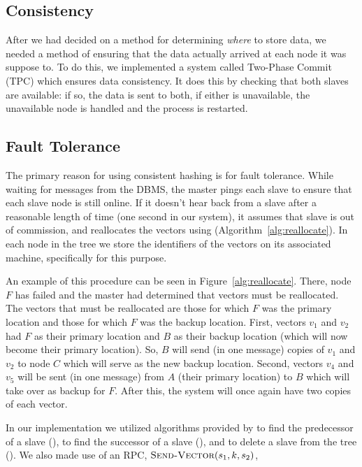 \subsection{Consistency}
After we had decided on a method for determining \emph{where} to store data,
we needed a method of ensuring that the data actually arrived at each node it
was suppose to. To do this, we implemented a system called Two-Phase Commit
(TPC) which ensures data consistency. It does this by checking that both slaves
are available: if so, the data is sent to both, if either is unavailable, the
unavailable node is handled and the process is restarted.
%
\subsection{Fault Tolerance}
The primary reason for using consistent hashing is for fault tolerance. While
waiting for messages from the DBMS, the master pings each slave to ensure that
each slave node is still online. If it doesn't hear back from a slave after a
reasonable length of time (one second in our system), it assumes that slave is
out of commission, and reallocates the vectors using 
(Algorithm~\ref{alg:reallocate}). In each node in the tree we store the
identifiers of the vectors on its associated machine, specifically for this
purpose.
\par
An example of this procedure can be seen in Figure~\ref{alg:reallocate}. There,
node \(F\) has failed and the master had determined that vectors must be
reallocated. The vectors that must be reallocated are those for which \(F\) was
the primary location and those for which \(F\) was the backup location. First,
vectors \(v_1\) and \(v_2\) had \(F\) as their primary location and \(B\) as
their backup location (which will now become their primary location). So, \(B\)
will send (in one message) copies of \(v_1\) and \(v_2\) to node \(C\) which
will serve as the new backup location. Second, vectors \(v_4\) and \(v_5\) will
be sent (in one message) from \(A\) (their primary location) to \(B\) which
will take over as backup for \(F\). After this, the system will once again have
two copies of each vector.
\par
%
In our implementation we utilized algorithms provided by \cite{cormen2009}
to find the predecessor of a slave (), to find the
successor of a slave (), and to delete a slave from the
tree (). We also made use of an RPC,
\(\mathrm{\textsc{Send-Vector}}(s_1, k, s_2)\),
